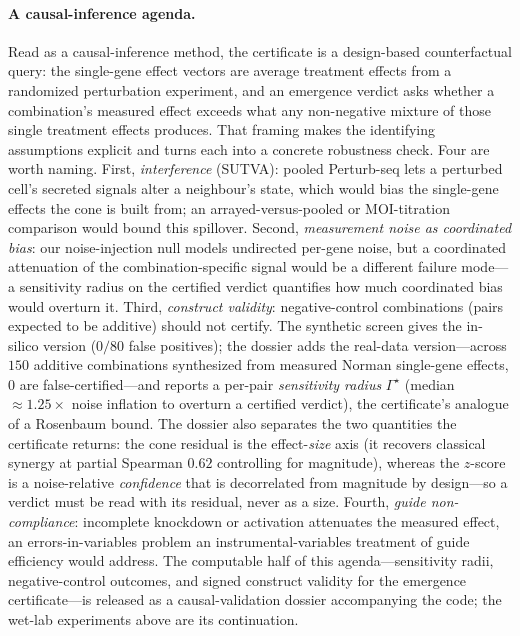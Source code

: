 \paragraph{A causal-inference agenda.}
Read as a causal-inference method, the certificate is a design-based counterfactual query: the
single-gene effect vectors are average treatment effects from a randomized perturbation
experiment, and an emergence verdict asks whether a combination's measured effect exceeds what any
non-negative mixture of those single treatment effects produces. That framing makes the identifying
assumptions explicit and turns each into a concrete robustness check. Four are worth naming. First,
\emph{interference} (SUTVA): pooled Perturb-seq lets a perturbed cell's secreted signals alter a
neighbour's state, which would bias the single-gene effects the cone is built from; an
arrayed-versus-pooled or MOI-titration comparison would bound this spillover. Second,
\emph{measurement noise as coordinated bias}: our noise-injection null models undirected per-gene
noise, but a coordinated attenuation of the combination-specific signal would be a different failure
mode---a sensitivity radius on the certified verdict quantifies how much coordinated bias would
overturn it. Third, \emph{construct validity}: negative-control combinations (pairs expected to be
additive) should not certify. The synthetic screen gives the in-silico version ($0/80$ false
positives); the dossier adds the real-data version---across $150$ additive combinations synthesized
from measured Norman single-gene effects, $0$ are false-certified---and reports a per-pair
\emph{sensitivity radius} $\Gamma^\star$ (median $\approx 1.25\times$ noise inflation to overturn a
certified verdict), the certificate's analogue of a Rosenbaum bound. The dossier also separates the
two quantities the certificate returns: the cone residual is the effect-\emph{size} axis (it recovers
classical synergy at partial Spearman $0.62$ controlling for magnitude), whereas the $z$-score is a
noise-relative \emph{confidence} that is decorrelated from magnitude by design---so a verdict must be
read with its residual, never as a size. Fourth, \emph{guide non-compliance}: incomplete knockdown
or activation attenuates the measured effect, an errors-in-variables problem an instrumental-variables
treatment of guide efficiency would address. The computable half of this agenda---sensitivity radii,
negative-control outcomes, and signed construct validity for the emergence certificate---is released
as a causal-validation dossier accompanying the code; the wet-lab experiments above are its
continuation.
